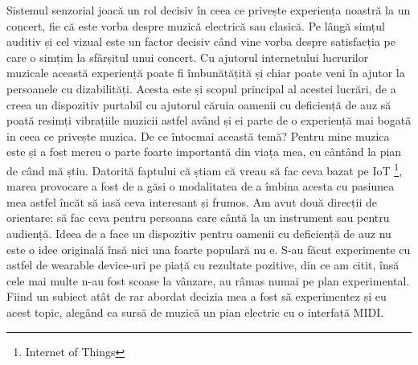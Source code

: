 \documentclass[../IoMusT.tex]{subfiles}
\begin{document}
\par Sistemul senzorial joacă un rol decisiv în ceea ce privește experiența noastră la un concert, fie că este vorba despre muzică electrică sau clasică. Pe lângă simțul auditiv și cel vizual este un factor decisiv când vine vorba despre satisfacția pe care o simțim la sfârșitul unui concert. Cu ajutorul internetului lucrurilor muzicale această experiență poate fi îmbunătățită și chiar poate veni în ajutor la persoanele cu dizabilități. Acesta este și scopul principal al acestei lucrări, de a creea un dispozitiv purtabil cu ajutorul căruia oamenii cu deficiență de auz să poată resimți vibrațiile muzicii astfel având și ei parte de o experiență mai bogată in ceea ce privește muzica. De ce întocmai această temă? Pentru mine mu\-zi\-ca este și a fost mereu o parte foarte importantă din viața mea, eu cântând la pian de când mă știu. Datorită faptului că știam că vreau să fac ceva bazat pe IoT \footnote{Internet of Things}, marea provocare a fost de a găsi o modalitatea de a îmbina acesta cu pasiunea mea astfel încăt să iasă ceva interesant și frumos. Am avut două direcții de orientare: să fac ceva pentru persoana care cântă la un instrument sau pentru audiență. Ideea de a face un dispozitiv pentru oamenii cu deficiență de auz nu este o idee originală însă nici una foarte populară nu e. S-au făcut experimente cu astfel de wearable device-uri pe piață cu rezultate pozitive, din ce am citit, însă cele mai multe n-au fost scoase la vânzare, au râmas numai pe plan experimental. Fiind un subiect atât de rar abordat decizia mea a fost să experimentez și eu acest topic, alegând ca sursă de muzică un pian electric cu o interfață MIDI.
\end{document}
